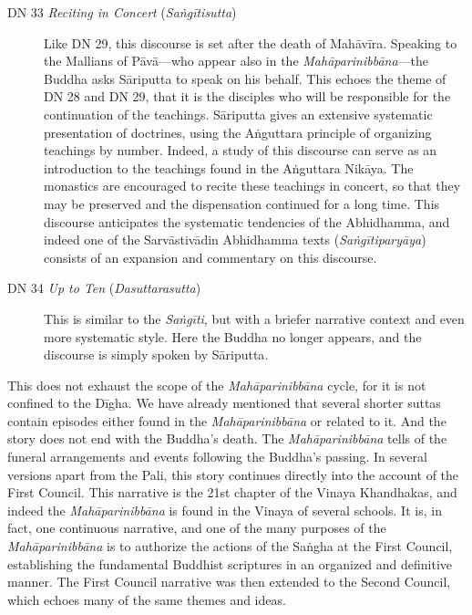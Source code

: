 \documentclass[12pt,openany]{book}%
\begin{document}
\begin{description}
\item[DN 33 \textit{Reciting in Concert} (\textit{\textsanskrit{Saṅgītisutta}})] Like DN 29, this discourse is set after the death of \textsanskrit{Mahāvīra}. Speaking to the Mallians of \textsanskrit{Pāvā}—who appear also in the \textit{\textsanskrit{Mahāparinibbāna}}—the Buddha asks \textsanskrit{Sāriputta} to speak on his behalf. This echoes the theme of DN 28 and DN 29, that it is the disciples who will be responsible for the continuation of the teachings. \textsanskrit{Sāriputta} gives an extensive systematic presentation of doctrines, using the \textsanskrit{Aṅguttara} principle of organizing teachings by number. Indeed, a study of this discourse can serve as an introduction to the teachings found in the \textsanskrit{Aṅguttara} \textsanskrit{Nikāya}. The monastics are encouraged to recite these teachings in concert, so that they may be preserved and the dispensation continued for a long time. This discourse anticipates the systematic tendencies of the Abhidhamma, and indeed one of the \textsanskrit{Sarvāstivādin} Abhidhamma texts (\textit{\textsanskrit{Saṅgītiparyāya}}) consists of an expansion and commentary on this discourse.%
\item[DN 34 \textit{Up to Ten} (\textit{Dasuttarasutta})] This is similar to the \textit{\textsanskrit{Saṅgīti}}, but with a briefer narrative context and even more systematic style. Here the Buddha no longer appears, and the discourse is simply spoken by \textsanskrit{Sāriputta}.%
\end{description}

This does not exhaust the scope of the \textit{\textsanskrit{Mahāparinibbāna}} cycle, for it is not confined to the \textsanskrit{Dīgha}. We have already mentioned that several shorter suttas contain episodes either found in the \textit{\textsanskrit{Mahāparinibbāna}} or related to it. And the story does not end with the Buddha’s death. The \textit{\textsanskrit{Mahāparinibbāna}} tells of the funeral arrangements and events following the Buddha’s passing. In several versions apart from the Pali, this story continues directly into the account of the First Council. This narrative is the 21st chapter of the Vinaya Khandhakas, and indeed the \textit{\textsanskrit{Mahāparinibbāna}} is found in the Vinaya of several schools. It is, in fact, one continuous narrative, and one of the many purposes of the \textit{\textsanskrit{Mahāparinibbāna}} is to authorize the actions of the \textsanskrit{Saṅgha} at the First Council, establishing the fundamental Buddhist scriptures in an organized and definitive manner. The First Council narrative was then extended to the Second Council, which echoes many of the same themes and ideas.
\end{document}
